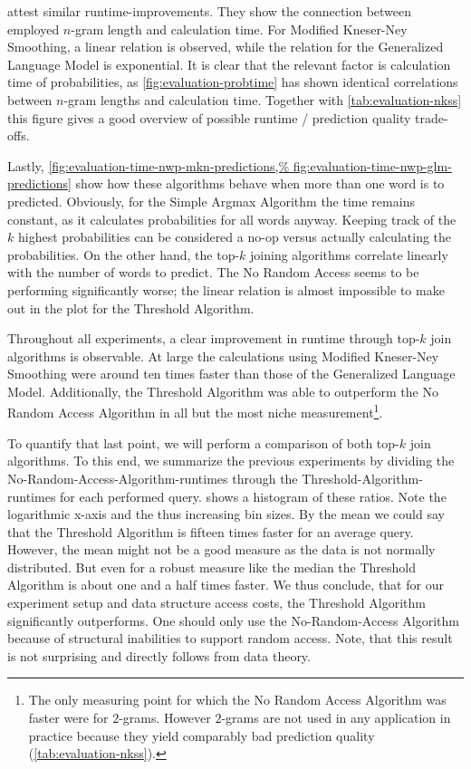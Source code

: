 attest similar runtime-improvements.
They show the connection between employed $n$-gram length and calculation time.
For Modified Kneser-Ney Smoothing, a linear relation is observed, while the
relation for the Generalized Language Model is exponential.
It is clear that the relevant factor is calculation time of probabilities, as
\cref{fig:evaluation-probtime} has shown identical correlations between $n$-gram
lengths and calculation time.
Together with \cref{tab:evaluation-nkss} this figure gives a good overview of
possible runtime / prediction quality trade-offs.

Lastly, \cref{fig:evaluation-time-nwp-mkn-predictions,%
fig:evaluation-time-nwp-glm-predictions} show how these algorithms behave
when more than one word is to predicted.
Obviously, for the Simple Argmax Algorithm the time remains constant, as it
calculates probabilities for all words anyway.
Keeping track of the $k$ highest probabilities can be considered a no-op versus
actually calculating the probabilities.
On the other hand, the top-$k$ joining algorithms correlate linearly with
the number of words to predict.
The No Random Access seems to be performing significantly worse; the linear
relation is almost impossible to make out in the plot for the Threshold
Algorithm.

Throughout all experiments, a clear improvement in runtime through top-$k$ join
algorithms is observable.
At large the calculations using Modified Kneser-Ney Smoothing were around ten
times faster than those of the Generalized Language Model.
Additionally, the Threshold Algorithm was able to outperform the No Random Access
Algorithm in all but the most niche measurement\footnote{The only measuring
point for which the No Random Access Algorithm was faster were for $2$-grams.
However $2$-grams are not used in any application in practice because they yield
comparably bad prediction quality (\cref{tab:evaluation-nkss}).}.

To quantify that last point, we will perform a comparison of both top-$k$ join
algorithms.
To this end, we summarize the previous experiments by dividing the
No-Random-Access-Algorithm-runtimes through the Threshold-Algorithm-runtimes
for each performed query.
 shows a histogram of these ratios.
Note the logarithmic x-axis and the thus increasing bin sizes.
By the mean we could say that the Threshold Algorithm is fifteen times faster
for an average query.
However, the mean might not be a good measure as the data is not normally
distributed.
But even for a robust measure like the median the Threshold Algorithm is about
one and a half times faster.
We thus conclude, that for our experiment setup and data structure access costs,
the Threshold Algorithm significantly outperforms.
One should only use the No-Random-Access Algorithm because of structural
inabilities to support random access.
Note, that this result is not surprising and directly follows from data theory.

